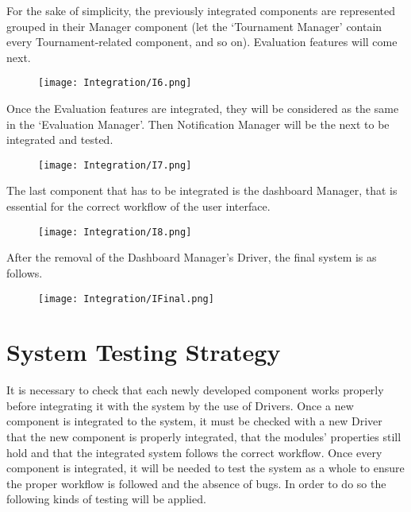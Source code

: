 For the sake of simplicity, the previously integrated components are represented grouped in their Manager component (let the ‘Tournament Manager’ contain every Tournament-related component, and so on). Evaluation features will come next.

\begin{figure}[H]
    \begin{center}
        \texttt{[image: Integration/I6.png]}
        \label{fig:Integration_6}%
    \end{center}
\end{figure}

Once the Evaluation features are integrated, they will be considered as the same in the ‘Evaluation Manager’. Then Notification Manager will be the next to be integrated and tested.


\begin{figure}[H]
    \begin{center}
        \texttt{[image: Integration/I7.png]}
        \label{fig:Integration_7}%
    \end{center}
\end{figure}

The last component that has to be integrated is the dashboard Manager, that is essential for the correct workflow of the user interface.


\begin{figure}[H]
    \begin{center}
        \texttt{[image: Integration/I8.png]}
        \label{fig:Integration_8}%
    \end{center}
\end{figure}

After the removal of the Dashboard Manager’s Driver, the final system is as follows.

\begin{figure}[H]
    \begin{center}
        \texttt{[image: Integration/IFinal.png]}
        \label{fig:Integration_final}%
    \end{center}
\end{figure}



\section{System Testing Strategy}

It is necessary to check that each newly developed component works properly before integrating it with the system by the use of Drivers. Once a new component is integrated to the system, it must be checked with a new Driver that the new component is properly integrated, that the modules’ properties still hold and that the integrated system follows the correct workflow. 
Once every component is integrated, it will be needed to test the system as a whole to ensure the proper workflow is followed and the absence of bugs. In order to do so the following kinds of testing will be applied. 

